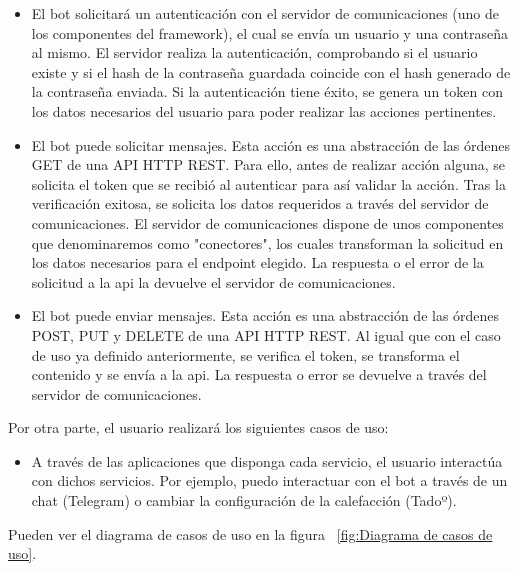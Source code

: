 \documentclass[spanish,12pt, a4paper, twoside]{paper}
\begin{document}
\begin{itemize}
\item El bot solicitará un autenticación con el servidor de comunicaciones (uno de los componentes del framework), el cual se envía un usuario y una contraseña al mismo. El servidor realiza la autenticación, comprobando si el usuario existe y si el hash de la contraseña guardada coincide con el hash generado de la contraseña enviada. Si la autenticación tiene éxito, se genera un token con los datos necesarios del usuario para poder realizar las acciones pertinentes.

\item El bot puede solicitar mensajes. Esta acción es una abstracción de las órdenes GET de una API HTTP REST. Para ello, antes de realizar acción alguna, se solicita el token que se recibió al autenticar para así validar la acción. Tras la verificación exitosa, se solicita los datos requeridos a través del servidor de comunicaciones. El servidor de comunicaciones dispone de unos componentes que denominaremos como "conectores", los cuales transforman la solicitud en los datos necesarios para el endpoint elegido. La respuesta o el error de la solicitud a la api la devuelve el servidor de comunicaciones.

\item El bot puede enviar mensajes. Esta acción es una abstracción de las órdenes POST, PUT y DELETE de una API HTTP REST. Al igual que con el caso de uso ya definido anteriormente, se verifica el token, se transforma el contenido y se envía a la api. La respuesta o error se devuelve a través del servidor de comunicaciones.
\end{itemize}

Por otra parte, el usuario realizará los siguientes casos de uso:

\begin{itemize}
\item A través de las aplicaciones que disponga cada servicio, el usuario interactúa con dichos servicios. Por ejemplo, puedo interactuar con el bot a través de un chat (Telegram) o cambiar la configuración de la calefacción (Tadoº).
\end{itemize}

Pueden ver el diagrama de casos de uso en la figura ~\ref{fig:Diagrama de casos de uso}.
\end{document}

